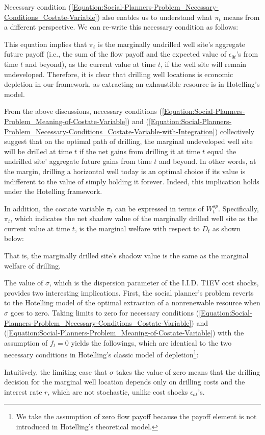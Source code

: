 Necessary condition (\ref{Equation:Social-Planners-Problem_Necessary-Conditions_Costate-Variable}) also enables us to understand what $\pi_{t}$ means from a different perspective. We can re-write this necessary condition as follows:

This equation implies that $\pi_{t}$ is the marginally undrilled well site's aggregate future payoff (i.e., the sum of the flow payoff and the expected value of $\epsilon_{0t}$'s from time $t$ and beyond), as the current value at time $t$, if the well site will remain undeveloped. Therefore, it is clear that drilling well locations is economic depletion in our framework, as extracting an exhaustible resource is in Hotelling's model. 

From the above discussions, necessary conditions (\ref{Equation:Social-Planners-Problem_Meaning-of-Costate-Variable}) and (\ref{Equation:Social-Planners-Problem_Necessary-Conditions_Costate-Variable-with-Integration}) collectively suggest that on the optimal path of drilling, the marginal undeveloped well site will be drilled at time $t$ if the net gains from drilling it at time $t$ equal the undrilled site' aggregate future gains from time $t$ and beyond. In other words, at the margin, drilling a horizontal well today is an optimal choice if its value is indifferent to the value of simply holding it forever. Indeed, this implication holds under the Hotelling framework. 

In addition, the costate variable $\pi_{t}$ can be expressed in terms of $W_{t}^{sp}$. Specifically, $\pi_{t}$, which indicates the net shadow value of the marginally drilled well site as the current value at time $t$, is the marginal welfare with respect to $D_{t}$ as shown below:
 
That is, the marginally drilled site's shadow value is the same as the marginal welfare of drilling. 

The value of $\sigma$, which is the dispersion parameter of the I.I.D. T1EV cost shocks, provides two interesting implications. First, the social planner's problem reverts to the Hotelling model of the optimal extraction of a nonrenewable resource when $\sigma$ goes to zero. Taking limits to zero for necessary conditions (\ref{Equation:Social-Planners-Problem_Necessary-Conditions_Costate-Variable}) and (\ref{Equation:Social-Planners-Problem_Meaning-of-Costate-Variable}) with the assumption of $f_{t} = 0$ yields the followings, which are identical to the two necessary conditions in Hotelling's classic model of depletion\footnote{We take the assumption of zero flow payoff because the payoff element is not introduced in Hotelling's theoretical model.}:

Intuitively, the limiting case that $\sigma$ takes the value of zero means that the drilling decision for the marginal well location depends only on drilling costs and the interest rate $r$, which are not stochastic, unlike cost shocks $\epsilon_{at}$'s.

